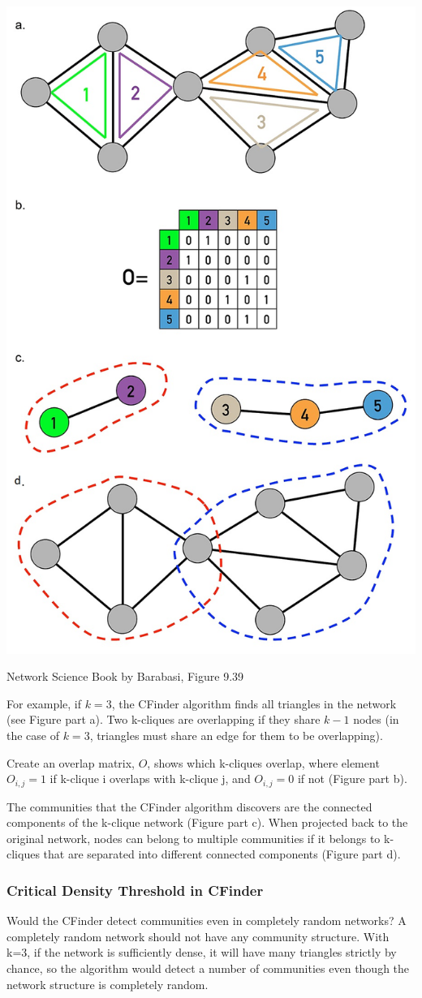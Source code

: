 \documentclass[11pt]{scrartcl} %
\begin{document}
\begin{center}
\includegraphics[width=0.5\linewidth]{img/L8.1-CFinder.jpg}

{\tiny Network Science Book by Barabasi, Figure 9.39}
\end{center}

For example, if $k=3$, the CFinder algorithm finds all triangles in the network (see Figure part a). Two k-cliques are overlapping if they share $k-1$ nodes (in the case of $k=3$, triangles must share an edge for them to be overlapping). 

Create an overlap matrix, $O$, shows which k-cliques overlap, where element $O_{i,j}=1$ if k-clique i overlaps with k-clique j, and $O_{i,j}=0$ if not (Figure part b).

The communities that the CFinder algorithm discovers are the connected components of the k-clique network (Figure part c). When projected back to the original network, nodes can belong to multiple communities if it belongs to k-cliques that are separated into different connected components (Figure part d).

\subsubsection{Critical Density Threshold in CFinder}
Would the CFinder detect communities even in completely random networks? A completely random network should not have any community structure. With k=3, if the network is sufficiently dense, it will have many triangles strictly by chance, so the algorithm would detect a number of communities even though the network structure is completely random.
\end{document}

